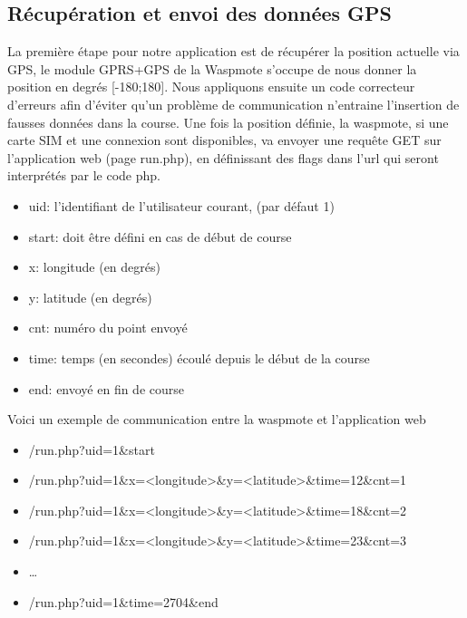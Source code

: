 \documentclass[a4paper,11pt]{article}
\begin{document}
\subsection{Récupération et envoi des données GPS}
La première étape pour notre application est de récupérer la position actuelle via GPS, le module GPRS+GPS de la Waspmote s'occupe de nous donner la position en degrés [-180;180].\newline
Nous appliquons ensuite un code correcteur d'erreurs afin d'éviter qu'un problème de communication n'entraine l'insertion de fausses données dans la course.\newline
Une fois la position définie, la waspmote, si une carte SIM et une connexion sont disponibles, va envoyer une requête GET sur l'application web (page run.php), en définissant des flags dans l'url qui seront interprétés par le code php.
\begin{itemize}
\item uid: l'identifiant de l'utilisateur courant, (par défaut 1)
\item start: doit être défini en cas de début de course
\item x: longitude (en degrés)
\item y: latitude (en degrés)
\item cnt: numéro du point envoyé
\item time: temps (en secondes) écoulé depuis le début de la course
\item end: envoyé en fin de course
\end{itemize}
Voici un exemple de communication entre la waspmote et l'application web
\begin{itemize}
\item /run.php?uid=1\&start
\item /run.php?uid=1\&x=<longitude>\&y=<latitude>\&time=12\&cnt=1
\item /run.php?uid=1\&x=<longitude>\&y=<latitude>\&time=18\&cnt=2
\item /run.php?uid=1\&x=<longitude>\&y=<latitude>\&time=23\&cnt=3
\item \ldots
\item /run.php?uid=1\&time=2704\&end
\end{itemize}
\end{document}
